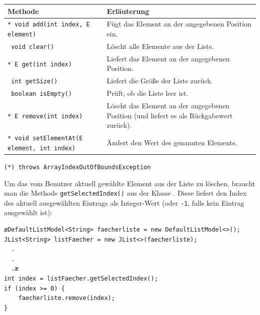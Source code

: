 \medskip
\bgroup
\def\arraystretch{1.2}
\begin{tabularx}{\textwidth}{|p{85mm}|X|}
\hline
\textbf{Methode} & \textbf{Erläuterung}
\\ \hline
\texttt{* void add(int index, E element)} & 
Fügt das Element an der angegebenen Position ein.
\\ \hline
\texttt{  void clear()} &
Löscht alle Elemente aus der Liste.
\\ \hline
\texttt{* E get(int index)} &
Liefert das Element an der angegebenen Position.
\\ \hline
\texttt{  int getSize()} &
Liefert die Größe der Liste zurück.
\\ \hline
\texttt{  boolean isEmpty()} &
Prüft, ob die Liste leer ist.
\\ \hline
\texttt{* E remove(int index)} & 
Löscht das Element an der angegebenen Position (und liefert es als Rückgabewert
zurück). 
\\ \hline
\texttt{* void setElementAt(E element, int index)} & 
Ändert den Wert des genannten Elements. 
\\ \hline
\end{tabularx}
\egroup

\medskip
\noindent \texttt{(*) throws ArrayIndexOutOfBoundsException} 

\medskip
Um das vom Benutzer aktuell gewählte Element aus der Liste zu löschen,
braucht man die Methode \lstinline|getSelectedIndex()| aus der Klasse
. Diese liefert den Index des aktuell ausgewählten Eintrags als
Integer-Wert (oder \lstinline|-1|, falls kein Eintrag ausgewählt ist):

\begin{lstlisting}
æDefaultListModel<String> faecherliste = new DefaultListModel<>();
JList<String> listFaecher = new JList<>(faecherliste);
  .
  .
  .æ
int index = listFaecher.getSelectedIndex();
if (index >= 0) {
    faecherliste.remove(index);
}
\end{lstlisting}

\subsection{}

